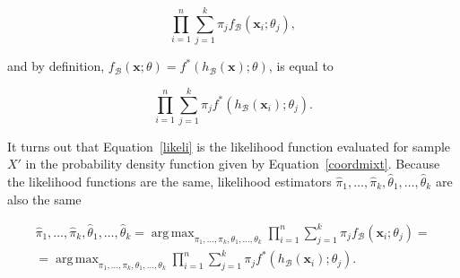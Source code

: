 \documentclass[10pt, a4paper]{article}
\DeclareMathOperator*{\argmax}{arg\,max}
\begin{document}
\begin{equation}
\prod_{i=1}^n \sum_{j=1}^k \pi_j f_\mathcal{B}(\textbf{x}_i; \theta_j),
\end{equation}

and by definition, $f_\mathcal{B}(\textbf{x} ; \theta) = f^*(h_\mathcal{B}(\textbf{x}) ; \theta)$, is equal to 

\begin{equation}\label{likeli}
\prod_{i=1}^n \sum_{j=1}^k \pi_j f^*(h_\mathcal{B}(\textbf{x}_i); \theta_j).
\end{equation}

It turns out that Equation~\ref{likeli} is the likelihood function evaluated for sample $X'$ in the probability density function given by Equation~\ref{coordmixt}. Because the likelihood functions are the same, likelihood estimators $\hat{\pi}_1, \dots, \hat{\pi}_k, \hat{\theta}_1, \dots, \hat{\theta}_k$ are also the same

\begin{eqnarray}
\hat{\pi}_1, \dots, \hat{\pi}_k, \hat{\theta}_1, \dots, \hat{\theta}_k = \argmax_{\pi_1, \dots, \pi_k, \theta_1, \dots, \theta_k} \prod_{i=1}^n \sum_{j=1}^k \pi_j f_\mathcal{B}(\textbf{x}_i; \theta_j) = \\ 
= \argmax_{\pi_1, \dots, \pi_k, \theta_1, \dots, \theta_k} \prod_{i=1}^n \sum_{j=1}^k \pi_j f^*(h_\mathcal{B}(\textbf{x}_i); \theta_j).
\end{eqnarray}

% 
\end{document}
